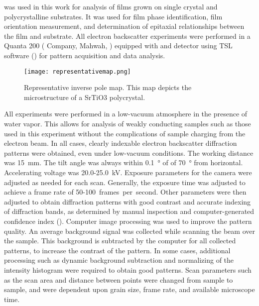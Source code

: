 was used in this work for analysis of  films grown on single crystal and polycrystalline substrates. It was used for film phase identification, film orientation measurement, and determination of epitaxial relationships between the film and substrate. All electron backscatter experiments were performed in a Quanta 200  ( Company, Mahwah, ) equipped with and  detector using TSL software () for pattern acquisition and data analysis.
\begin{figure}
\begin{center}
\texttt{[image: representativemap.png]}
\caption[Representative  inverse pole map]{%
	Representative  inverse pole map. This map depicts the 
	microstructure of a SrTiO3 polycrystal.}
\label{fig:representativemap}
\end{center}
\end{figure}
All experiments were performed in a low-vacuum atmosphere in the presence of water vapor. This allows for analysis of weakly conducting samples such as those used in this experiment without the complications of sample charging from the electron beam. In all cases, clearly indexable electron backscatter diffraction patterns were obtained, even under low-vacuum conditions. The working distance was \SI{15}{\milli\meter}. The tilt angle was always within \SI{0.1}{\degree} of of \SI{70}{\degree} from horizontal. Accelerating voltage was 20.0-25.0~\si{\kilo\volt}. Exposure parameters for the  camera were adjusted as needed for each scan. Generally, the exposure time was adjusted to achieve a frame rate of 50-100~frames~per~second. Other parameters were then adjusted to obtain diffraction patterns with good contrast and accurate indexing of diffraction bands, as determined by manual inspection and computer-generated confidence index ().  Computer image processing was used to improve the pattern quality. An average background signal was collected while scanning the beam over the sample. This background is subtracted by the computer for all collected patterns, to increase the contrast of the pattern. In some cases, additional processing such as dynamic background subtraction and normalizing of the intensity histogram were required to obtain good patterns. Scan parameters such as the scan area and distance between points were changed from sample to sample, and were dependent upon grain size, frame rate, and available microscope time.



